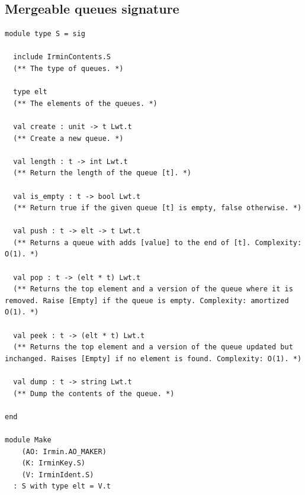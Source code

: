\documentclass{article}
\renewcommand{\-}{\hyp}
\begin{document}
\subsection{Mergeable queues signature}
\begin{lstlisting}
module type S = sig

  include IrminContents.S
  (** The type of queues. *)

  type elt
  (** The elements of the queues. *)

  val create : unit -> t Lwt.t
  (** Create a new queue. *)

  val length : t -> int Lwt.t
  (** Return the length of the queue [t]. *)

  val is_empty : t -> bool Lwt.t
  (** Return true if the given queue [t] is empty, false otherwise. *)

  val push : t -> elt -> t Lwt.t
  (** Returns a queue with adds [value] to the end of [t]. Complexity: O(1). *)

  val pop : t -> (elt * t) Lwt.t
  (** Returns the top element and a version of the queue where it is removed. Raise [Empty] if the queue is empty. Complexity: amortized O(1). *)

  val peek : t -> (elt * t) Lwt.t
  (** Returns the top element and a version of the queue updated but inchanged. Raises [Empty] if no element is found. Complexity: O(1). *)

  val dump : t -> string Lwt.t
  (** Dump the contents of the queue. *)

end

module Make
    (AO: Irmin.AO_MAKER)
    (K: IrminKey.S)
    (V: IrminIdent.S)
  : S with type elt = V.t
\end{lstlisting}

\newpage
\glsaddall
\printglossaries
\end{document}
